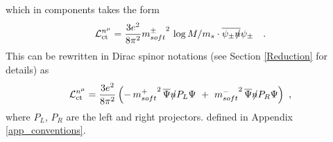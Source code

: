 \documentclass[12pt]{revtex4}
\newcommand{\slashed}[1]{\hbox{{$#1$}\llap{$/$}}}
\begin{document}
        which in components takes the form
\begin{equation}
\mathcal{L}_{\rm ct}^{n^\mu} = 
\frac{3e^2}
     {8\pi^2} {m_{soft}^\pm}^2 \, \log M/m_s \cdot
\overline{\psi_\pm \slashed{n}} \psi_\pm~~~.
\end{equation}
This can be rewritten in Dirac spinor notations
(see Section \ref{Reduction} for details) as
\begin{equation}
\label{SB_chiral_by_gauge}
\mathcal{L}_{\rm ct}^{n^\mu} = 
\frac{3e^2}
     {8\pi^2}
\left( -\, {m_{soft}^+}^2\, \overline{\Psi} \slashed{n}
      P_L \Psi 
~+~
{m_{soft}^-}^2\, \overline{\Psi} \slashed{n}
  P_R \Psi \right)~,
\end{equation}
where $ P_L $, $ P_R $ are the left and right projectors. 
defined in Appendix \ref{app_conventions}.
\end{document}
